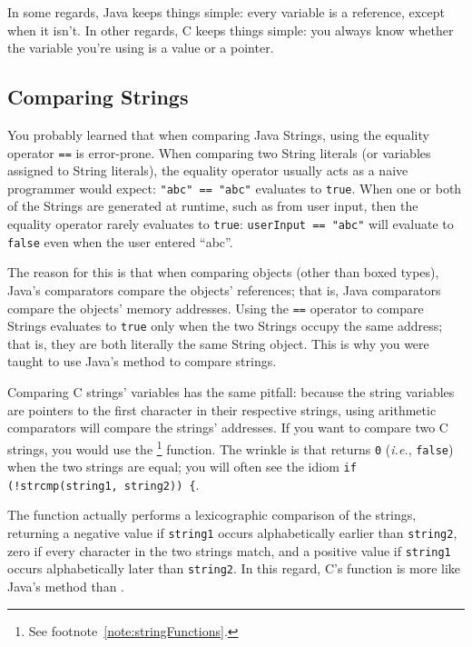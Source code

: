 In some regards, Java keeps things simple: every variable is a reference, except when it isn't.
In other regards, C keeps things simple: you always know whether the variable you're using is a value or a pointer.

\subsection{Comparing Strings}

You probably learned that when comparing Java Strings, using the equality operator \lstinline{==} is error-prone.
When comparing two String literals (or variables assigned to String literals), the equality operator usually acts as a naive programmer would expect:
\lstinline{"abc" == "abc"} evaluates to \lstinline{true}.
When one or both of the Strings are generated at runtime, such as from user input, then the equality operator rarely evaluates to \lstinline{true}:
\lstinline{userInput == "abc"} will evaluate to \lstinline{false} even when the user entered ``abc''.

The reason for this is that when comparing objects (other than boxed types), Java's comparators compare the objects' references;
that is, Java comparators compare the objects' memory addresses.
Using the \lstinline{==} operator to compare Strings evaluates to \lstinline{true} only when the two Strings occupy the same address;
that is, they are both literally the same String object.
This is why you were taught to use Java's  method to compare strings.

Comparing C strings' variables has the same pitfall:
because the string variables are pointers to the first character in their respective strings, using arithmetic comparators will compare the strings' addresses.
If you want to compare two C strings, you would use the \footnote{See footnote~\ref{note:stringFunctions}.} function.
The wrinkle is that  returns \lstinline{0} (\textit{i.e.}, \lstinline{false}) when the two strings are equal;
you will often see the idiom \lstinline{if (!strcmp(string1, string2)) {}.

The  function actually performs a lexicographic comparison of the strings, returning a negative value if \lstinline{string1} occurs alphabetically earlier than \lstinline{string2}, zero if every character in the two strings match, and a positive value if \lstinline{string1} occurs alphabetically later than \lstinline{string2}.
In this regard, C's  function is more like Java's  method than .

